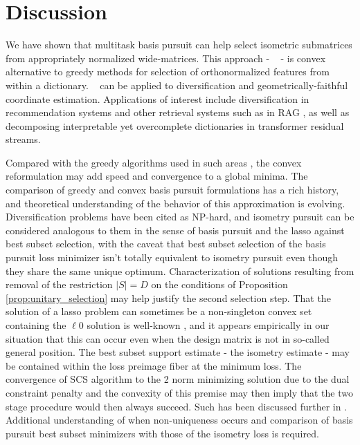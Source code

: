 \section{Discussion}
\label{sec:discussion}

We have shown that multitask basis pursuit can help select isometric submatrices from appropriately normalized wide-matrices.
This approach - \isometrypursuit~ - is convex alternative to greedy methods for selection of orthonormalized features from within a dictionary.
\isometrypursuit~ can be applied to diversification and geometrically-faithful coordinate estimation.
Applications of interest include diversification in recommendation systems \cite{Carbonell2017-gi, Wu2019-uk, Langchain} and other retrieval systems such as in RAG \cite{Gao2023-cn, Pickett2024-ad, In2024-um, Weiss2024-xm, Vectara}, as well as decomposing interpretable yet overcomplete dictionaries in transformer residual streams.

Compared with the greedy algorithms used in such areas \cite{Carbonell1998-ji, Barioni, Drosou, Qin2012-ok, KUNAVER2017154, Guo-shengbo, Abdool,Yu2016AGA,  Huang2024-wr, Pickett2024-ad}, the convex reformulation may add speed and convergence to a global minima.
The comparison of greedy \cite{Mallat93-wi, Mallat, Pati-93, Tropp05-ml} and convex \cite{Chen2001-hh, Tropp06-sg,Chen2006TheoreticalRO} basis pursuit formulations has a rich history, and theoretical understanding of the behavior of this approximation is evolving.
Diversification problems have been cited as NP-hard, and isometry pursuit can be considered analogous to them in the sense of basis pursuit and the lasso against best subset selection, with the caveat that best subset selection of the basis pursuit loss minimizer isn't totally equivalent to isometry pursuit even though they share the same unique optimum.
Characterization of solutions resulting from removal of the restriction $|S| = D$ on the conditions of Proposition \ref{prop:unitary_selection} may help justify the second selection step.
That the solution of a lasso problem can sometimes be a non-singleton convex set containing the $\ell 0 $ solution is well-known \cite{Osborne2000OnTL, DOSSAL2012117, Chrtien2011OnTG, Tibshirani2012TheLP, Ewald2017OnTD, Ali2018TheGL, Schneider2020-qt, Mishkin2022TheSP,Dupuis2019TheGO,Debarre2020OnTU,Everink2024TheGA}, and it appears empirically in our situation that this can occur even when the design matrix is not in so-called general position.
The best subset support estimate - the isometry estimate - may be contained within the loss preimage fiber at the minimum loss.
The convergence of SCS algorithm to the 2 norm minimizing solution due to the dual constraint penalty and the convexity of this premise may then imply that the two stage procedure would then always succeed.
Such has been discussed further in \cite{Donoho2006ForML, Mishkin2022TheSP}.
Additional understanding of when non-uniqueness occurs and comparison of basis pursuit best subset minimizers with those of the isometry loss is required.

